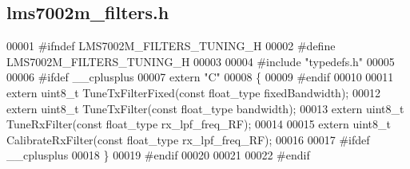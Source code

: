 \subsection{lms7002m\+\_\+filters.\+h}
\label{lms7002m__filters_8h_source}

\begin{DoxyCode}
00001 \textcolor{preprocessor}{#ifndef LMS7002M\_FILTERS\_TUNING\_H}
00002 \textcolor{preprocessor}{#define LMS7002M\_FILTERS\_TUNING\_H}
00003 
00004 \textcolor{preprocessor}{#include "typedefs.h"}
00005 
00006 \textcolor{preprocessor}{#ifdef \_\_cplusplus}
00007 \textcolor{keyword}{extern} \textcolor{stringliteral}{"C"}
00008 \{
00009 \textcolor{preprocessor}{#endif}
00010 
00011 \textcolor{keyword}{extern} uint8\_t TuneTxFilterFixed(\textcolor{keyword}{const} float_type fixedBandwidth);
00012 \textcolor{keyword}{extern} uint8\_t TuneTxFilter(\textcolor{keyword}{const} float_type bandwidth);
00013 \textcolor{keyword}{extern} uint8\_t TuneRxFilter(\textcolor{keyword}{const} float_type rx\_lpf\_freq\_RF);
00014 
00015 \textcolor{keyword}{extern} uint8\_t CalibrateRxFilter(\textcolor{keyword}{const} float_type rx\_lpf\_freq\_RF);
00016 
00017 \textcolor{preprocessor}{#ifdef \_\_cplusplus}
00018 \}
00019 \textcolor{preprocessor}{#endif}
00020 
00021 
00022 \textcolor{preprocessor}{#endif}
\end{DoxyCode}

